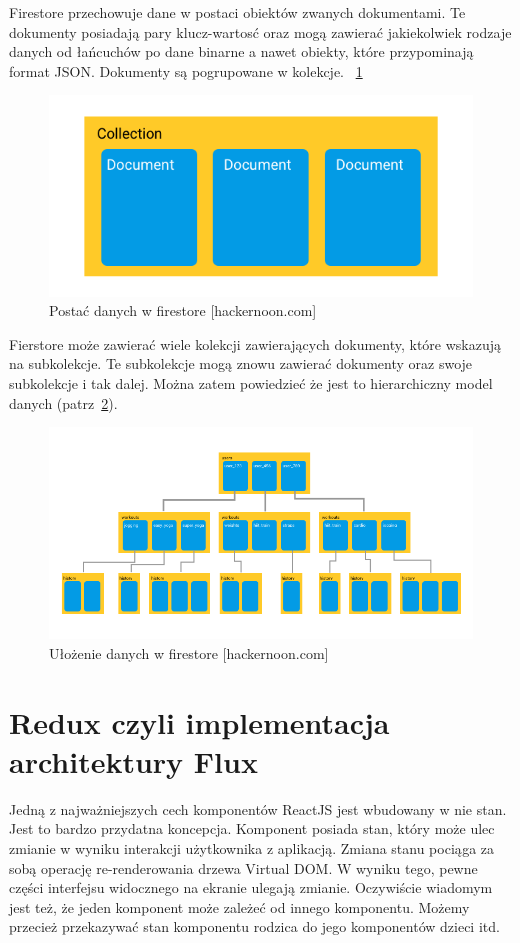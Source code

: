 Firestore przechowuje dane w postaci obiektów zwanych dokumentami.
Te dokumenty posiadają pary klucz-wartosć oraz mogą zawierać jakiekolwiek rodzaje danych
od łańcuchów po dane binarne a nawet obiekty, które przypominają format JSON\@.
Dokumenty są pogrupowane w kolekcje.
~\ref{rys:firestoreData}

\begin{figure}
	\centering\includegraphics[width=.6\textwidth]{img/firestoreData.png}
	\caption{Postać danych w firestore [hackernoon.com]}\label{rys:firestoreData}%
\end{figure}

Fierstore może zawierać wiele kolekcji zawierających dokumenty, które wskazują na subkolekcje.
Te subkolekcje mogą znowu zawierać dokumenty oraz swoje subkolekcje i tak dalej.
Można zatem powiedzieć że jest to hierarchiczny model danych (patrz~\ref{rys:firestoreTree}).
~\cite{www_hakermoon}

\begin{figure}
	\centering\includegraphics[width=.6\textwidth]{img/firestoreTree.png}
	\caption{Ułożenie danych w firestore [hackernoon.com]}\label{rys:firestoreTree}%
\end{figure}

\section{Redux czyli implementacja architektury Flux}

Jedną z najważniejszych cech komponentów ReactJS jest wbudowany w nie stan.
Jest to bardzo przydatna koncepcja. Komponent posiada stan,
który może ulec zmianie w wyniku interakcji użytkownika z aplikacją.
Zmiana stanu pociąga za sobą operację re-renderowania drzewa Virtual DOM\@.
W wyniku tego, pewne części interfejsu widocznego na ekranie ulegają zmianie.
Oczywiście wiadomym jest też, że jeden komponent może zależeć od innego komponentu.
Możemy przecież przekazywać stan komponentu rodzica do jego komponentów dzieci itd.

